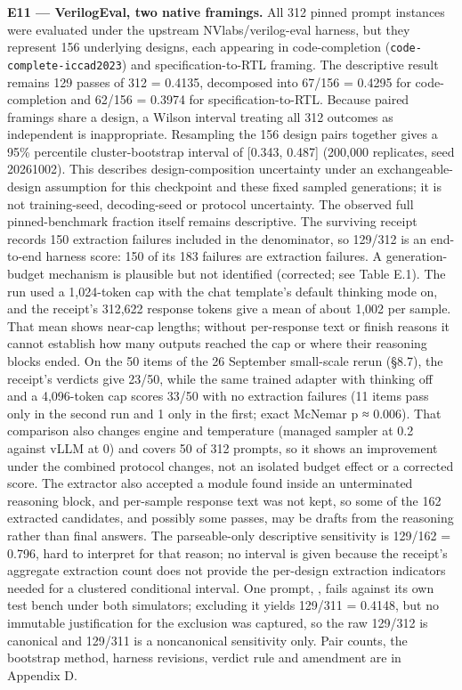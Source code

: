 \documentclass[12pt,a4paper]{report}
\DeclareRobustCommand{\longtok}[1]{\texttt{\seqsplit{#1}}}
\begin{document}
\textbf{E11 --- VerilogEval, two native framings.} All 312 pinned prompt
instances were evaluated under the upstream NVlabs/verilog-eval harness,
but they represent 156 underlying designs, each appearing in
code-completion (\texttt{code-complete-iccad2023}) and
specification-to-RTL framing. The descriptive result remains 129 passes
of 312 = 0.4135, decomposed into 67/156 = 0.4295 for code-completion and
62/156 = 0.3974 for specification-to-RTL. Because paired framings share
a design, a Wilson interval treating all 312 outcomes as independent is
inappropriate. Resampling the 156 design pairs together gives a 95\%
percentile cluster-bootstrap interval of {[}0.343, 0.487{]} (200,000
replicates, seed 20261002). This describes design-composition
uncertainty under an exchangeable-design assumption for this checkpoint
and these fixed sampled generations; it is not training-seed,
decoding-seed or protocol uncertainty. The observed full
pinned-benchmark fraction itself remains descriptive. The surviving
receipt records 150 extraction failures included in the denominator, so
129/312 is an end-to-end harness score: 150 of its 183 failures are
extraction failures. A generation-budget mechanism is plausible but not
identified (corrected; see Table E.1). The run used a 1,024-token cap
with the chat template's default thinking mode on, and the receipt's
312,622 response tokens give a mean of about 1,002 per sample. That mean
shows near-cap lengths; without per-response text or finish reasons it
cannot establish how many outputs reached the cap or where their
reasoning blocks ended. On the 50 items of the 26 September small-scale
rerun (§8.7), the receipt's verdicts give 23/50, while the same trained
adapter with thinking off and a 4,096-token cap scores 33/50 with no
extraction failures (11 items pass only in the second run and 1 only in
the first; exact McNemar p ≈ 0.006). That comparison also changes engine
and temperature (managed sampler at 0.2 against vLLM at 0) and covers 50
of 312 prompts, so it shows an improvement under the combined protocol
changes, not an isolated budget effect or a corrected score. The
extractor also accepted a module found inside an unterminated reasoning
block, and per-sample response text was not kept, so some of the 162
extracted candidates, and possibly some passes, may be drafts from the
reasoning rather than final answers. The parseable-only descriptive
sensitivity is 129/162 = 0.796, hard to interpret for that reason; no
interval is given because the receipt's aggregate extraction count does
not provide the per-design extraction indicators needed for a clustered
conditional interval. One prompt,
\longtok{verilog\_eval/spec-to-rtl/Prob099\_\allowbreak{}m2014\_\allowbreak{}q6c}, fails against
its own test bench under both simulators; excluding it yields 129/311 =
0.4148, but no immutable justification for the exclusion was captured,
so the raw 129/312 is canonical and 129/311 is a noncanonical
sensitivity only. Pair counts, the bootstrap method, harness revisions,
verdict rule and amendment are in Appendix D.
\end{document}
